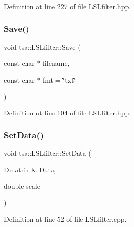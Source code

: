 Definition at line 227 of file L\+S\+Lfilter.\+hpp.

\mbox{\label{classtsa_1_1_l_s_lfilter_ae8aa6f5275313f49e88bf4f6361092f9}} 
\subsubsection{\texorpdfstring{Save()}{Save()}}
{\footnotesize\ttfamily void tsa\+::\+L\+S\+Lfilter\+::\+Save (\begin{DoxyParamCaption}\item[{const char $\ast$}]{filename,  }\item[{const char $\ast$}]{fmt = {\ttfamily \char`\"{}txt\char`\"{}} }\end{DoxyParamCaption})\hspace{0.3cm}{\ttfamily [inline]}}



Definition at line 104 of file L\+S\+Lfilter.\+hpp.

\mbox{\label{classtsa_1_1_l_s_lfilter_ab01da31972cf54c49a28920c8235e8c9}} 
\subsubsection{\texorpdfstring{Set\+Data()}{SetData()}}
{\footnotesize\ttfamily void tsa\+::\+L\+S\+Lfilter\+::\+Set\+Data (\begin{DoxyParamCaption}\item[{\hyperlink{namespacetsa_ad260cd21c1891c4ed391fe788569aba4}{Dmatrix} \&}]{Data,  }\item[{double}]{scale }\end{DoxyParamCaption})}



Definition at line 52 of file L\+S\+Lfilter.\+cpp.

\mbox{\label{classtsa_1_1_l_s_lfilter_a1adaa3058f09e50b73a88520844d2b90}} 
